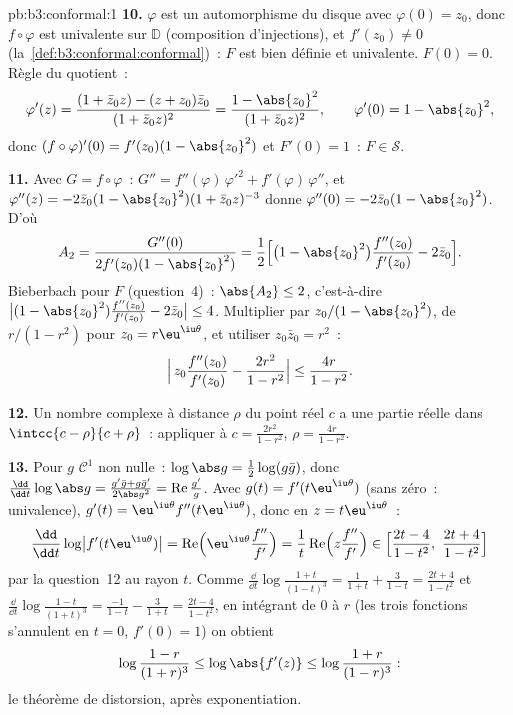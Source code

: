 \begin{solution}{pb:b3:conformal:1}
\textbf{10.} $\varphi$ est un automorphisme du disque avec
$\varphi(0) = z_0$, donc $f\circ\varphi$ est univalente sur
$\mathbb D$ (composition d'injections), et $f'(z_0) \neq 0$
(la~\cref{def:b3:conformal:conformal})~: $F$ est bien
définie et univalente. $F(0) = 0$. Règle du quotient~:
\[
\varphi'(z) = \frac{(1 + \bar z_0z) - (z + z_0)\bar z_0}
{(1 + \bar z_0z)^2}
= \frac{1 - \abs{z_0}^2}{(1 + \bar z_0z)^2},
\qquad \varphi'(0) = 1 - \abs{z_0}^2 ,
\]
donc $(f\circ\varphi)'(0) = f'(z_0)(1 - \abs{z_0}^2)$ et
$F'(0) = 1$~: $F \in \mathcal S$.

\textbf{11.} Avec $G = f\circ\varphi$~: $G'' =
f''(\varphi)\,\varphi'^2 + f'(\varphi)\,\varphi''$, et
$\varphi''(z) = -2\bar z_0(1 - \abs{z_0}^2)(1 + \bar
z_0z)^{-3}$ donne $\varphi''(0) = -2\bar z_0(1 -
\abs{z_0}^2)$. D'où
\[
A_2 = \frac{G''(0)}{2f'(z_0)(1 - \abs{z_0}^2)}
= \frac12\Bigl[\bigl(1 - \abs{z_0}^2\bigr)
\frac{f''(z_0)}{f'(z_0)} - 2\bar z_0\Bigr] .
\]
Bieberbach pour $F$ (question~4)~: $\abs{A_2} \leq 2$,
c'est-à-dire $\bigl|(1 - \abs{z_0}^2)\frac{f''(z_0)}{f'(z_0)}
- 2\bar z_0\bigr| \leq 4$. Multiplier par $z_0/(1 -
\abs{z_0}^2)$, de  $r/(1 - r^2)$ pour $z_0 =
r\eu^{\iu\theta}$, et utiliser $z_0\bar z_0 = r^2$~:
\[
\Bigl|\,z_0\frac{f''(z_0)}{f'(z_0)} -
\frac{2r^2}{1 - r^2}\Bigr| \leq \frac{4r}{1 - r^2} .
\]

\textbf{12.} Un nombre complexe à distance $\rho$ du point
réel $c$ a une partie réelle dans $\intcc{c - \rho}{c +
\rho}$~: appliquer à $c = \frac{2r^2}{1-r^2}$, $\rho =
\frac{4r}{1-r^2}$.

\textbf{13.} Pour $g$ $\mathcal C^1$ non nulle~:
$\log\abs g = \frac12\log(g\bar g)$, donc $\frac{\dd}{\dd
t}\log\abs g = \frac{g'\bar g + g\bar g'}{2\abs g^2} =
\operatorname{Re}\frac{g'}g$. Avec $g(t) =
f'(t\eu^{\iu\theta})$ (sans zéro~: univalence), $g'(t) =
\eu^{\iu\theta}f''(t\eu^{\iu\theta})$, donc en $z =
t\eu^{\iu\theta}$~:
\[
\frac{\dd}{\dd t}\log\bigl|f'(t\eu^{\iu\theta})\bigr|
= \operatorname{Re}\Bigl(\eu^{\iu\theta}
\frac{f''}{f'}\Bigr)
= \frac1t\operatorname{Re}\Bigl(z\frac{f''}{f'}\Bigr)
\in \Bigl[\frac{2t - 4}{1 - t^2},\
\frac{2t + 4}{1 - t^2}\Bigr]
\]
par la question~12 au rayon $t$. Comme $\frac{\dd}{\dd
t}\log\frac{1+t}{(1-t)^3} = \frac1{1+t} + \frac3{1-t} =
\frac{2t+4}{1-t^2}$ et $\frac{\dd}{\dd
t}\log\frac{1-t}{(1+t)^3} = \frac{-1}{1-t} - \frac3{1+t} =
\frac{2t-4}{1-t^2}$, en intégrant de $0$ à $r$ (les trois
fonctions s'annulent en $t = 0$, $f'(0) = 1$) on obtient
\[
\log\frac{1-r}{(1+r)^3} \leq \log\abs{f'(z)} \leq
\log\frac{1+r}{(1-r)^3} :
\]
le théorème de distorsion, après exponentiation.


\end{solution}
